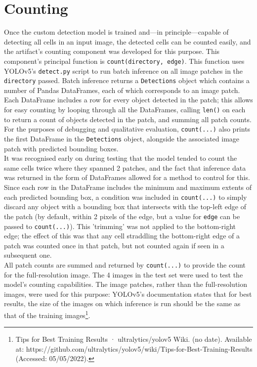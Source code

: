 \section{Counting}
Once the custom detection model is trained and⁠—in principle⁠—capable of detecting all cells in an input image, the detected cells can be counted easily, and the artifact's counting component was developed for this purpose. This component's principal function is \verb|count(directory, edge)|. This function uses YOLOv5's \verb|detect.py| script to run batch inference on all image patches in the \verb`directory` passed. Batch inference returns a \verb|Detections| object which contains a number of Pandas DataFrames, each of which corresponds to an image patch. Each DataFrame includes a row for every object detected in the patch; this allows for easy counting by looping through all the DataFrames, calling \verb|len()| on each to return a count of objects detected in the patch, and summing all patch counts. For the purposes of debugging and qualitative evaluation, \verb|count(...)| also prints the first DataFrame in the \verb|Detections| object, alongside the associated image patch with predicted bounding boxes.\\

It was recognised early on during testing that the model tended to count the same cells twice where they spanned 2 patches, and the fact that inference data was returned in the form of DataFrames allowed for a method to control for this. Since each row in the DataFrame includes the minimum and maximum extents of each predicted bounding box, a condition was included in \verb|count(...)| to simply discard any object with a bounding box that intersects with the top-left edge of the patch (by default, within 2 pixels of the edge, but a value for \verb`edge` can be passed to \verb`count(...)`). This 'trimming' was not applied to the bottom-right edge; the effect of this was that any cell straddling the bottom-right edge of a patch was counted once in that patch, but not counted again if seen in a subsequent one.\\

All patch counts are summed and returned by \verb|count(...)| to provide the count for the full-resolution image. The 4 images in the test set were used to test the model's counting capabilities. The image patches, rather than the full-resolution images, were used for this purpose: YOLOv5's documentation states that for best results, the size of the images on which inference is run should be the same as that of the training images\footnote{Tips for Best Training Results · ultralytics/yolov5 Wiki. (no date). Available at: https://github.com/ultralytics/yolov5/wiki/Tips-for-Best-Training-Results (Accessed: 05/05/2022).}.\\


